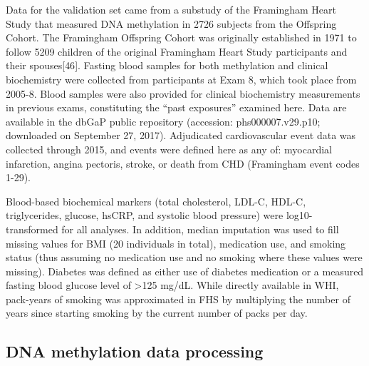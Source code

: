 \documentclass[]{article}
\theoremstyle{definition}
\theoremstyle{definition}
\theoremstyle{definition}
\theoremstyle{remark}
\begin{document}
Data for the validation set came from a substudy of the Framingham Heart
Study that measured DNA methylation in 2726 subjects from the Offspring
Cohort. The Framingham Offspring Cohort was originally established in
1971 to follow 5209 children of the original Framingham Heart Study
participants and their spouses{[}46{]}. Fasting blood samples for both
methylation and clinical biochemistry were collected from participants
at Exam 8, which took place from 2005-8. Blood samples were also
provided for clinical biochemistry measurements in previous exams,
constituting the ``past exposures'' examined here. Data are available in
the dbGaP public repository (accession: phs000007.v29.p10; downloaded on
September 27, 2017). Adjudicated cardiovascular event data was collected
through 2015, and events were defined here as any of: myocardial
infarction, angina pectoris, stroke, or death from CHD (Framingham event
codes 1-29).

Blood-based biochemical markers (total cholesterol, LDL-C, HDL-C,
triglycerides, glucose, hsCRP, and systolic blood pressure) were
log10-transformed for all analyses. In addition, median imputation was
used to fill missing values for BMI (20 individuals in total),
medication use, and smoking status (thus assuming no medication use and
no smoking where these values were missing). Diabetes was defined as
either use of diabetes medication or a measured fasting blood glucose
level of \textgreater{}125 mg/dL. While directly available in WHI,
pack-years of smoking was approximated in FHS by multiplying the number
of years since starting smoking by the current number of packs per day.

\subsection{DNA methylation data
processing}\label{dna-methylation-data-processing}
\end{document}
